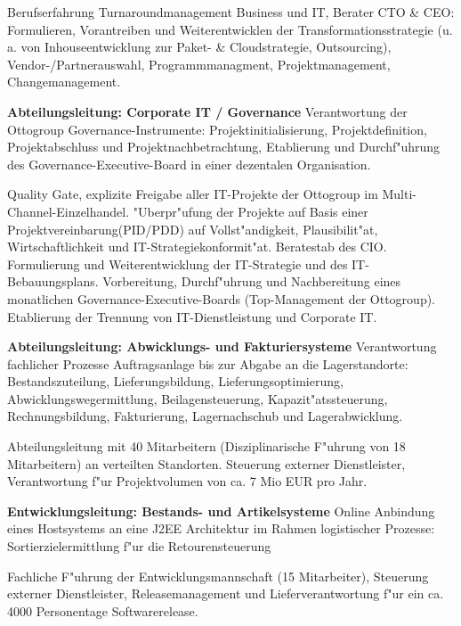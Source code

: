 \begin{rubric}{Berufserfahrung}
Turnaroundmanagement Business und IT, Berater CTO \& CEO: Formulieren, Vorantreiben und Weiterentwicklen der Transformationsstrategie (u. a. von Inhouseentwicklung zur Paket- \& Cloudstrategie, Outsourcing), Vendor-/Partnerauswahl, Programmmanagment, Projektmanagement, Changemanagement.\newline

\entry*[08/2009 - 10/2011] \textbf{Abteilungsleitung: Corporate IT / Governance}\newline
{} 
Verantwortung der Ottogroup Governance-Instrumente: Projektinitialisierung, Projektdefinition, Projektabschluss und Projektnachbetrachtung, Etablierung und Durchf"uhrung des Governance-Executive-Board in einer dezentalen Organisation.\axelvspace

Quality Gate, explizite Freigabe aller IT-Projekte der Ottogroup im Multi-Channel-Einzelhandel. "Uberpr"ufung der Projekte auf Basis einer Projektvereinbarung(PID/PDD) auf Vollst"andigkeit, Plausibilit"at, Wirtschaftlichkeit und IT-Strategiekonformit"at. Beratestab des CIO. Formulierung und Weiterentwicklung der IT-Strategie und des IT-Bebauungsplans. Vorbereitung, Durchf"uhrung und Nachbereitung eines monatlichen Governance-Executive-Boards (Top-Management der Ottogroup). Etablierung der Trennung von IT-Dienstleistung und Corporate IT.

\entry*[08/2006 - 07/2009] \textbf{Abteilungsleitung: Abwicklungs- und Fakturiersysteme}\newline
{} 
Verantwortung fachlicher Prozesse Auftragsanlage bis zur Abgabe an die Lagerstandorte: Bestandszuteilung,
Lieferungsbildung, Lieferungsoptimierung, Abwicklungswegermittlung, Beilagensteuerung, Kapazit"atssteuerung, Rechnungsbildung, Fakturierung, Lagernachschub und Lagerabwicklung.\axelvspace

Abteilungsleitung mit 40 Mitarbeitern (Disziplinarische F"uhrung von 18 Mitarbeitern) an verteilten Standorten. Steuerung externer Dienstleister, Verantwortung f"ur Projektvolumen von ca. 7 Mio EUR pro Jahr.

\entry*[01/2005 - 07/2006] \textbf{Entwicklungsleitung: Bestands- und Artikelsysteme}\newline
{} 
Online Anbindung eines Hostsystems an eine J2EE Architektur im Rahmen logistischer Prozesse: Sortierzielermittlung f"ur die Retourensteuerung\axelvspace

Fachliche F"uhrung der Entwicklungsmannschaft (15 Mitarbeiter), Steuerung externer Dienstleister, Releasemanagement und Lieferverantwortung f"ur ein ca. 4000 Personentage Softwarerelease.


\end{rubric}
